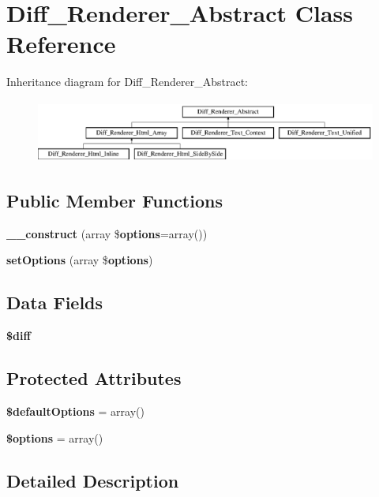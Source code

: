 \section{Diff\+\_\+\+Renderer\+\_\+\+Abstract Class Reference}
\label{class_diff___renderer___abstract}
Inheritance diagram for Diff\+\_\+\+Renderer\+\_\+\+Abstract\+:\begin{figure}[H]
\begin{center}
\leavevmode
\includegraphics[height=2.068965cm]{class_diff___renderer___abstract}
\end{center}
\end{figure}
\subsection*{Public Member Functions}
\begin{DoxyCompactItemize}
\item 
{\bf \+\_\+\+\_\+construct} (array \${\bf options}=array())
\item 
{\bf set\+Options} (array \${\bf options})
\end{DoxyCompactItemize}
\subsection*{Data Fields}
\begin{DoxyCompactItemize}
\item 
{\bf \$diff}
\end{DoxyCompactItemize}
\subsection*{Protected Attributes}
\begin{DoxyCompactItemize}
\item 
{\bf \$default\+Options} = array()
\item 
{\bf \$options} = array()
\end{DoxyCompactItemize}


\subsection{Detailed Description}


